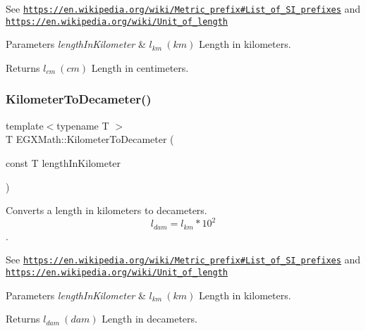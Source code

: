 See \href{https://en.wikipedia.org/wiki/Metric_prefix#List_of_SI_prefixes}{\tt https\+://en.\+wikipedia.\+org/wiki/\+Metric\+\_\+prefix\#\+List\+\_\+of\+\_\+\+S\+I\+\_\+prefixes} and \href{https://en.wikipedia.org/wiki/Unit_of_length}{\tt https\+://en.\+wikipedia.\+org/wiki/\+Unit\+\_\+of\+\_\+length} 
\begin{DoxyParams}{Parameters}
{\em length\+In\+Kilometer} & $ l_{km}\ (km)$ Length in kilometers. \\
\hline
\end{DoxyParams}
\begin{DoxyReturn}{Returns}
$ l_{cm}\ (cm)$ Length in centimeters. 
\end{DoxyReturn}
\mbox{\label{group___e_g_x_math-_conversions-_length_conversions-_s_i-_kilometer-_s_i_ga040acc3477237c471c0336e5b44d4654}} 
\subsubsection{\texorpdfstring{Kilometer\+To\+Decameter()}{KilometerToDecameter()}}
{\footnotesize\ttfamily template$<$typename T $>$ \\
T E\+G\+X\+Math\+::\+Kilometer\+To\+Decameter (\begin{DoxyParamCaption}\item[{const T}]{length\+In\+Kilometer }\end{DoxyParamCaption})}



Converts a length in kilometers to decameters. \[ l_{dam}=l_{km} * 10^{2} \]. 

See \href{https://en.wikipedia.org/wiki/Metric_prefix#List_of_SI_prefixes}{\tt https\+://en.\+wikipedia.\+org/wiki/\+Metric\+\_\+prefix\#\+List\+\_\+of\+\_\+\+S\+I\+\_\+prefixes} and \href{https://en.wikipedia.org/wiki/Unit_of_length}{\tt https\+://en.\+wikipedia.\+org/wiki/\+Unit\+\_\+of\+\_\+length} 
\begin{DoxyParams}{Parameters}
{\em length\+In\+Kilometer} & $ l_{km}\ (km)$ Length in kilometers. \\
\hline
\end{DoxyParams}
\begin{DoxyReturn}{Returns}
$ l_{dam}\ (dam)$ Length in decameters. 
\end{DoxyReturn}
\mbox{\label{group___e_g_x_math-_conversions-_length_conversions-_s_i-_kilometer-_s_i_ga6b9e471fb53794741dcf3859d316b1c1}} 
